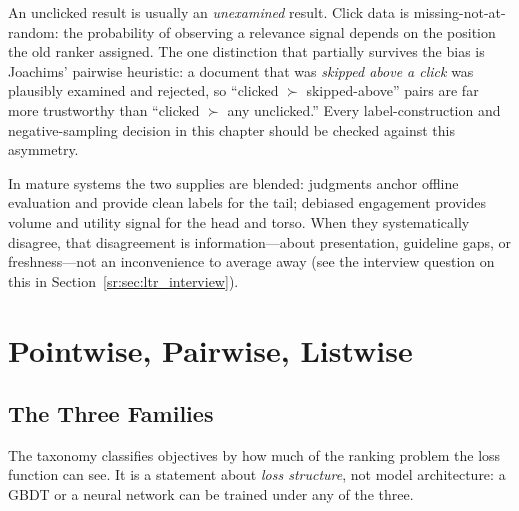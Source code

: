 \begin{keyinsight}
An unclicked result is usually an \textit{unexamined} result. Click data is missing-not-at-random: the probability of observing a relevance signal depends on the position the old ranker assigned. The one distinction that partially survives the bias is Joachims' pairwise heuristic: a document that was \textit{skipped above a click} was plausibly examined and rejected, so ``clicked $\succ$ skipped-above'' pairs are far more trustworthy than ``clicked $\succ$ any unclicked.'' Every label-construction and negative-sampling decision in this chapter should be checked against this asymmetry.
\end{keyinsight}

In mature systems the two supplies are blended: judgments anchor offline evaluation and provide clean labels for the tail; debiased engagement provides volume and utility signal for the head and torso. When they systematically disagree, that disagreement is information---about presentation, guideline gaps, or freshness---not an inconvenience to average away (see the interview question on this in Section~\ref{sr:sec:ltr_interview}).

\section{Pointwise, Pairwise, Listwise}
\label{sr:sec:ltr_taxonomy}

\subsection{The Three Families}

The taxonomy classifies objectives by how much of the ranking problem the loss function can see. It is a statement about \textit{loss structure}, not model architecture: a GBDT or a neural network can be trained under any of the three.

